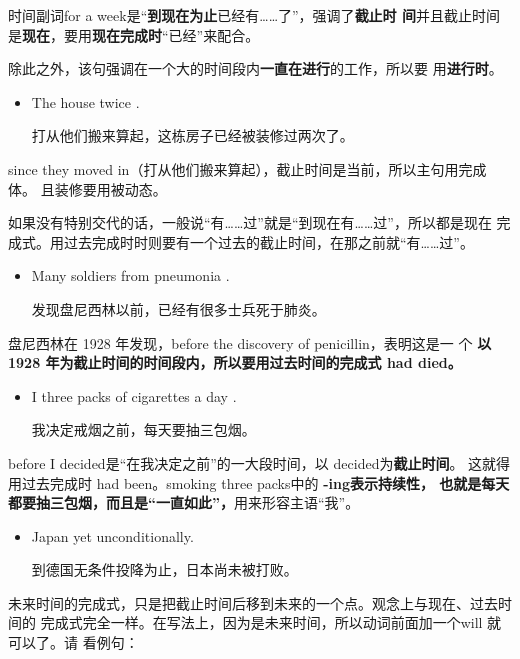 时间副词for a week是“\textbf{到现在为止}已经有……了”，强调了\textbf{截止时
  间}并且截止时间是\textbf{现在}，要用\textbf{现在完成时}“已经”来配合。

除此之外，该句强调在一个大的时间段内\textbf{一直在进行}的工作，所以要
用\textbf{进行时}。


\begin{itemize}
\item  The house  twice .

  打从他们搬来算起，这栋房子已经被装修过两次了。
\end{itemize}

since they moved in（打从他们搬来算起），截止时间是当前，所以主句用完成体。
且装修要用被动态。


如果没有特别交代的话，一般说“有……过”就是“到现在有……过”，所以都是现在
完成式。用过去完成时时则要有一个过去的截止时间，在那之前就“有……过”。

\begin{itemize}
\item  Many soldiers  from pneumonia .

  发现盘尼西林以前，已经有很多士兵死于肺炎。
\end{itemize}

盘尼西林在 1928 年发现，before the discovery of penicillin，表明这是一
个 \textbf{以 1928 年为截止时间的时间段内，所以要用过去时间的完成式 had
  died。}

\begin{itemize}
\item  I  three packs of cigarettes a day .

  我决定戒烟之前，每天要抽三包烟。
\end{itemize}

before I decided是“在我决定之前”的一大段时间，以 decided为\textbf{截止时间}。
这就得用过去完成时 had been。smoking three packs中的 \textbf{-ing表示持续性，
  也就是每天都要抽三包烟，而且是“一直如此”，}用来形容主语“我”。


\begin{itemize}
\item  Japan  yet  unconditionally.

  到德国无条件投降为止，日本尚未被打败。
\end{itemize}


未来时间的完成式，只是把截止时间后移到未来的一个点。观念上与现在、过去时间的
完成式完全一样。在写法上，因为是未来时间，所以动词前面加一个will 就可以了。请
看例句：

